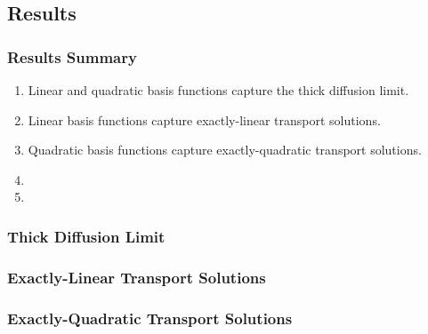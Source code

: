 \documentclass[compress,10pt]{beamer}
\begin{document}
\subsection{Results}
\begin{frame}[t]\frametitle{Results Summary}
\begin{block}{}
\begin{enumerate}
\item Linear and quadratic basis functions capture the thick diffusion limit.
\item Linear basis functions capture exactly-linear transport solutions.
\item Quadratic basis functions capture exactly-quadratic transport solutions.
\item 
\item 
\end{enumerate}
\end{block}
\end{frame}
\begin{frame}[t]\frametitle{Thick Diffusion Limit}

\end{frame}
\begin{frame}[t]\frametitle{Exactly-Linear Transport Solutions}

\end{frame}
\begin{frame}[t]\frametitle{Exactly-Quadratic Transport Solutions}

\end{frame}
\end{document}
